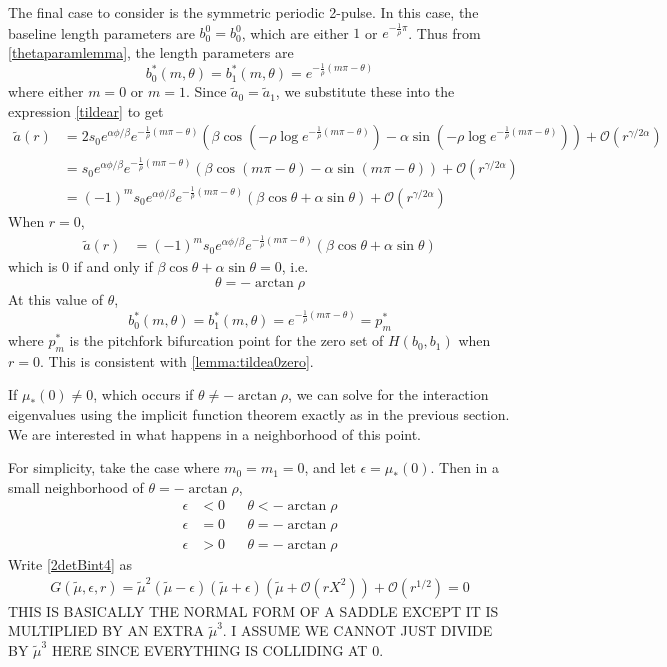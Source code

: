 \documentclass[thesis.tex]{subfiles}
\begin{document}
The final case to consider is the symmetric periodic 2-pulse. In this case, the baseline length parameters are $b_0^0 = b_0^0$, which are either $1$ or $e^{-\frac{1}{\rho} \pi}$. Thus from \cref{thetaparamlemma}, the length parameters are
\[
b_0^*(m, \theta) = b_1^*(m, \theta) = e^{-\frac{1}{\rho}(m \pi - \theta) }
\]
where either $m = 0$ or $m = 1$. Since $\tilde{a}_0 = \tilde{a}_1$, we substitute these into the expression \cref{tildear} to get 
\begin{align*}
\tilde{a}(r) &= 2 s_0 e^{\alpha \phi/\beta} e^{-\frac{1}{\rho}(m \pi - \theta) } \left( \beta \cos\left(-\rho \log e^{-\frac{1}{\rho}(m \pi - \theta) } \right) - \alpha \sin \left(-\rho \log e^{-\frac{1}{\rho}(m \pi - \theta) } \right) \right) + \mathcal{O}(r^{\gamma/2\alpha}) \\
&= s_0 e^{\alpha \phi/\beta} e^{-\frac{1}{\rho}(m \pi - \theta) } \left( \beta \cos\left( m \pi - \theta \right) - \alpha \sin \left( m \pi - \theta \right) \right) + \mathcal{O}(r^{\gamma/2\alpha}) \\
&= (-1)^m s_0 e^{\alpha \phi/\beta} e^{-\frac{1}{\rho}(m \pi - \theta) } \left( \beta \cos \theta + \alpha \sin \theta \right) + \mathcal{O}(r^{\gamma/2\alpha}) 
\end{align*}
When $r = 0$, 
\begin{align*}
\tilde{a}(r) &= (-1)^m s_0 e^{\alpha \phi/\beta} e^{-\frac{1}{\rho}(m \pi - \theta) } \left( \beta \cos \theta + \alpha \sin \theta \right)
\end{align*}
which is 0 if and only if $\beta \cos \theta + \alpha \sin \theta = 0$, i.e.
\[
\theta = -\arctan \rho
\]
At this value of $\theta$,
\[
b_0^*(m, \theta) = b_1^*(m, \theta)= e^{-\frac{1}{\rho}(m \pi - \theta)} = p^*_m
\]
where $p^*_m$ is the pitchfork bifurcation point for the zero set of $H(b_0, b_1)$ when $r = 0$. This is consistent with \cref{lemma:tildea0zero}. 

If $\mu_*(0) \neq 0$, which occurs if $\theta \neq -\arctan \rho$, we can solve for the interaction eigenvalues using the implicit function theorem exactly as in the previous section. We are interested in what happens in a neighborhood of this point.

For simplicity, take the case where $m_0 = m_1 = 0$, and let $\epsilon = \mu_*(0)$. Then in a small neighborhood of $\theta = -\arctan \rho$,
\begin{align*}
\epsilon &< 0 && \theta < -\arctan \rho \\
\epsilon &= 0 && \theta = -\arctan \rho \\
\epsilon &> 0 && \theta = -\arctan \rho 
\end{align*}
Write \cref{2detBint4} as
\begin{equation}\label{2detBintBif}
\begin{aligned}
G(\tilde{\mu},\epsilon, r) = \tilde{\mu}^2 (\tilde{\mu} - \epsilon)(\tilde{\mu} + \epsilon)\left( \tilde{\mu} + \mathcal{O}(r X^2)\right) + \mathcal{O}( r^{1/2} ) = 0
\end{aligned}
\end{equation}
THIS IS BASICALLY THE NORMAL FORM OF A SADDLE EXCEPT IT IS MULTIPLIED BY AN EXTRA $\tilde{\mu}^3$. I ASSUME WE CANNOT JUST DIVIDE BY $\tilde{\mu}^3$ HERE SINCE EVERYTHING IS COLLIDING AT 0.
\end{document}
